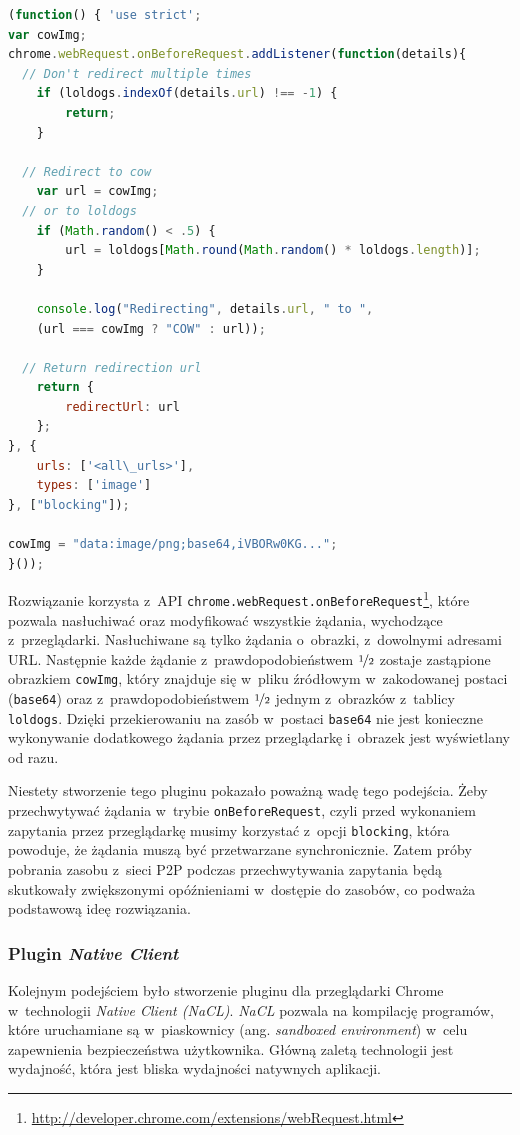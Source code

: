 \documentclass[a4paper,11pt]{scrartcl}
\newcommand{\f}{\texttt}
\begin{document}
\begin{lstlisting}[language={JavaScript}, label={lst_plugin_1}, 
  caption={Kod rozszerzenia dla przeglądarki Chrome, realizujący \textit{proof-of-concept}.}]
(function() { 'use strict';
var cowImg;
chrome.webRequest.onBeforeRequest.addListener(function(details){
  // Don't redirect multiple times
	if (loldogs.indexOf(details.url) !== -1) {
		return;
	}
	
  // Redirect to cow
	var url = cowImg;
  // or to loldogs
	if (Math.random() < .5) {
		url = loldogs[Math.round(Math.random() * loldogs.length)];
	}
	
	console.log("Redirecting", details.url, " to ", 
    (url === cowImg ? "COW" : url));
    
  // Return redirection url
	return {
		redirectUrl: url
	};
}, {
	urls: ['<all\_urls>'],
	types: ['image']
}, ["blocking"]);

cowImg = "data:image/png;base64,iVBORw0KG...";
}());
\end{lstlisting}

Rozwiązanie korzysta z~API \f{chrome.webRequest.onBeforeRequest}\footnote{\url{http://developer.chrome.com/extensions/webRequest.html}}, które pozwala nasłuchiwać oraz modyfikować wszystkie żądania, wychodzące z~przeglądarki. Nasłuchiwane są tylko żądania o~obrazki, z~dowolnymi adresami URL. Następnie każde żądanie z~prawdopodobieństwem $\nicefrac{1}{2}$ zostaje zastąpione obrazkiem \f{cowImg}, który znajduje się w~pliku źródłowym w~zakodowanej postaci (\f{base64}) oraz z~prawdopodobieństwem $\nicefrac{1}{2}$ jednym z~obrazków z~tablicy \f{loldogs}. Dzięki przekierowaniu na zasób w~postaci \f{base64} nie jest konieczne wykonywanie dodatkowego żądania przez przeglądarkę i~obrazek jest wyświetlany od razu. 

Niestety stworzenie tego pluginu pokazało poważną wadę tego podejścia. Żeby przechwytywać żądania w~trybie \f{onBeforeRequest}, czyli przed wykonaniem zapytania przez przeglądarkę musimy korzystać z~opcji \f{blocking}, która powoduje, że żądania muszą być przetwarzane synchronicznie. Zatem próby pobrania zasobu z~sieci P2P podczas przechwytywania zapytania będą skutkowały zwiększonymi opóźnieniami w~dostępie do zasobów, co podważa podstawową ideę rozwiązania.

\subsubsection{Plugin \textit{Native Client}}
\label{sect_plugin_2}
Kolejnym podejściem było stworzenie pluginu dla przeglądarki Chrome w~technologii \textit{Native Client (NaCL)}. \textit{NaCL} pozwala na kompilację programów, które uruchamiane są w~piaskownicy (ang. \textit{sandboxed environment}) w~celu zapewnienia bezpieczeństwa użytkownika. Główną zaletą technologii jest wydajność, która jest bliska wydajności natywnych aplikacji.
\end{document}
